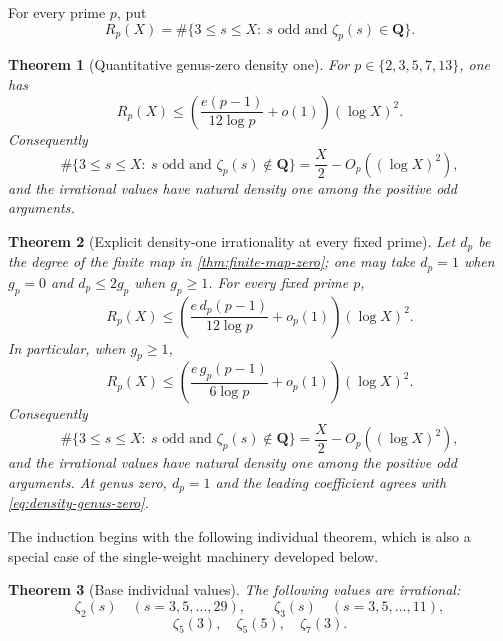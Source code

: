 \documentclass[11pt]{article}
\newtheorem{theorem}{Theorem}[section]
\theoremstyle{definition}
\theoremstyle{remark}
\newcommand{\Q}{\mathbf Q}
\begin{document}
For every prime $p$, put
\begin{equation}\label{eq:Rp-def}
 R_p(X)=\#\{3\le s\le X:\ s\text{ odd and }\zeta_p(s)\in\Q\}.
\end{equation}

\begin{theorem}[Quantitative genus-zero density one]\label{thm:density-genus-zero}
For $p\in\{2,3,5,7,13\}$, one has
\begin{equation}\label{eq:density-genus-zero}
 \boxed{
 R_p(X)\le
 \left(\frac{e(p-1)}{12\log p}+o(1)\right)(\log X)^2.}
\end{equation}
Consequently
\[
 \#\{3\le s\le X:\ s\text{ odd and }\zeta_p(s)\notin\Q\}
 =\frac X2-O_p((\log X)^2),
\]
and the irrational values have natural density one among the positive odd
arguments.
\end{theorem}

\begin{theorem}[Explicit density-one irrationality at every fixed prime]
\label{thm:density-all-primes}
Let $d_p$ be the degree of the finite map in
\cref{thm:finite-map-zero}; one may take $d_p=1$ when $g_p=0$ and
$d_p\le2g_p$ when $g_p\ge1$.  For every fixed prime $p$,
\begin{equation}\label{eq:density-all-primes}
 \boxed{
 R_p(X)\le
 \left(\frac{e\,d_p(p-1)}{12\log p}+o_p(1)\right)(\log X)^2.}
\end{equation}
In particular, when $g_p\ge1$,
\begin{equation}\label{eq:density-all-primes-genus}
 R_p(X)\le
 \left(\frac{e\,g_p(p-1)}{6\log p}+o_p(1)\right)(\log X)^2.
\end{equation}
Consequently
\[
 \#\{3\le s\le X:\ s\text{ odd and }\zeta_p(s)\notin\Q\}
 =\frac X2-O_p((\log X)^2),
\]
and the irrational values have natural density one among the positive odd
arguments.  At genus zero, $d_p=1$ and the leading coefficient agrees with
\eqref{eq:density-genus-zero}.
\end{theorem}

The induction begins with the following individual theorem, which is also a
special case of the single-weight machinery developed below.

\begin{theorem}[Base individual values]\label{thm:individual}
The following values are irrational:
\[
 \zeta_2(s)\quad(s=3,5,\ldots,29),
 \qquad
 \zeta_3(s)\quad(s=3,5,\ldots,11),
\]
\[
 \zeta_5(3),\quad\zeta_5(5),\quad\zeta_7(3).
\]
\end{theorem}
\end{document}
